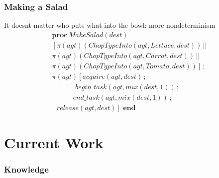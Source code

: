 \documentclass{beamer}
\begin{document}
\begin{frame}
\frametitle{Making a Salad}
It doesnt matter who puts what into the bowl: more nondeterminism
\[
\begin{array}{c}
\mathbf{proc}\, MakeSalad(dest)\\
\left[\pi(agt)(ChopTypeInto(agt,Lettuce,dest))\,||\right.\\
\pi(agt)(ChopTypeInto(agt,Carrot,dest))\,||\\
\left.\pi(agt)(ChopTypeInto(agt,Tomato,dest))\right]\,;\\
\pi(agt)\left[acquire(agt,dest)\,;\right.\\
\,\,\,\,\,\,\,\,\,\,\,\,\,\,\,\,\,\,\,\, begin\_ task(agt,mix(dest,1))\,;\\
\,\,\,\,\,\,\,\,\,\,\,\,\,\,\,\,\,\, end\_ task(agt,mix(dest,1))\,;\\
\left.\,\,\,\, release(agt,dest)\right]\,\,\mathbf{end}\end{array}\]
\end{frame}

\section{Current Work}

\begin{frame}
\frametitle{Knowledge}

\end{frame}
\end{document}
